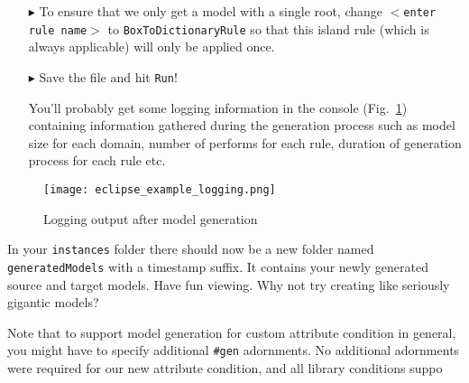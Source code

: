 \begin{itemize}

\item[$\blacktriangleright$]  To ensure that we only get a model with a single root, change \texttt{$<$enter rule name$>$} to \texttt{BoxToDictionaryRule} so that this island rule (which is always applicable) will only be applied once.

\item[$\blacktriangleright$] Save the file and hit \texttt{Run}!

You'll probably get some logging information in the console (Fig.~\ref{eclipse:modelgen_log}) containing information gathered during the generation process such as model size for each domain, number of performs for each rule, duration of generation process for each rule etc.

\end{itemize}


\begin{figure}[htbp]
\renewcommand\figurename{Figure} 
\begin{center}
\texttt{[image: eclipse\_example\_logging.png]}
\caption{Logging output after model generation}
\label{eclipse:modelgen_log}
\end{center}
\end{figure}

In your \texttt{instances} folder there should now be a new folder named \texttt{generated\-Models} with a timestamp suffix. 
It contains your newly generated source and target models.
Have fun viewing.
Why not try creating like seriously gigantic models?

Note that to support model generation for custom attribute condition in general, you might have to specify additional \texttt{\#gen} adornments. 
No additional adornments were required for our new attribute condition, and all library conditions suppo

